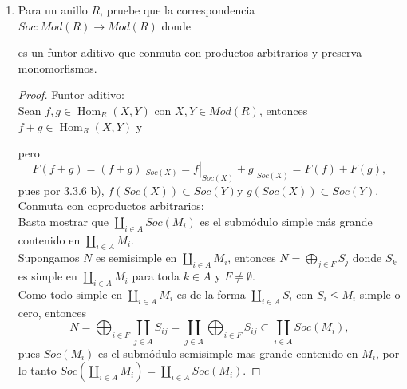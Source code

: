 \documentclass{article}
\begin{document}
\begin{enumerate}[label=\textbf{Ej \arabic*.}]
\begin{proof}
			En resumen, $h:I_{1} \longrightarrow I_{2}$ y $f:I_{1} \longrightarrow I_{1}$ son envolventes inyectivas de $I_{1}$. Por el ejercicio anterior, existe $g:I_{1} \longrightarrow I_{2}$ un isomorfismo en $Mod\lrprth{R}$ tal que $gf=h$. $\therefore h$ es isomorfismo.
		\end{proof}
		
		\item 
		Para un anillo $R$, pruebe que la correspondencia\\ $Soc:Mod(R)\longrightarrow Mod(R)$ donde\\
		
		es un funtor aditivo que conmuta con productos arbitrarios y preserva monomorfismos.
		\begin{proof}
			Funtor aditivo:\\
			Sean $f,g\in  \operatorname{Hom}_R(X,Y)$ con $X,Y\in Mod(R)$, entonces $f+g\in \operatorname{Hom}_R(X,Y)$ y 
			pero \[F(f+g)=(f+g)|_{Soc(X)}=f|_{Soc(X)}+g|_{Soc(X)}=F(f)+F(g),
			\]
			pues por 3.3.6 b), $f(Soc(X))\subset Soc(Y)$\quad y \quad $g(Soc(X))\subset Soc(Y).$\\
			
			Conmuta con coproductos arbitrarios:\\
			
			Basta mostrar que $\displaystyle\coprod_{i\in A}Soc(M_i)$ es el submódulo simple más grande contenido en $\displaystyle\coprod_{i\in A}M_i$.\\
			Supongamos $N$ es semisimple en $\displaystyle\coprod_{i\in A}M_i$, entonces $N=\displaystyle\bigoplus_{j\in F}S_j$ donde $S_k$ es simple en
			$\displaystyle\coprod_{i\in A}M_i$ para toda $k\in A$ y $F\neq \emptyset$.\\
			
			Como todo simple en $\displaystyle\coprod_{i\in A}M_i$ es de la forma $\displaystyle\coprod_{i\in A}S_i$ con $S_i\leq M_i$ simple o cero, 
			entonces
			\[
			N=\bigoplus_{i\in F}\coprod_{j\in A}S_{ij}=\coprod_{j\in A}\bigoplus_{i\in F}S_{ij}\subset \coprod_{i\in A}Soc(M_i), 
			\]
			pues $Soc(M_i)$ es el submódulo semisimple mas grande contenido en $M_i$, por lo tanto 
			$Soc(\displaystyle\coprod_{i\in A}M_i)=\displaystyle\coprod_{i\in A}Soc(M_i).$
			

\end{proof}
\end{enumerate}
\end{document}
